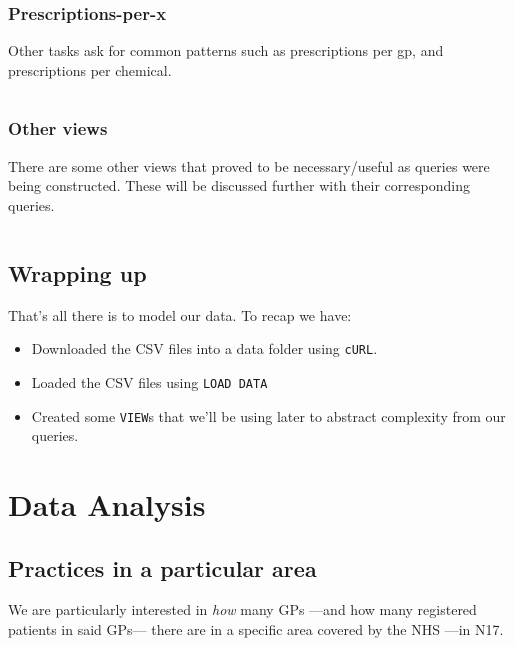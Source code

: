 \documentclass[english,a4paper,]{report}
\providecommand{\tightlist}{%
  \setlength{\itemsep}{0pt}\setlength{\parskip}{0pt}}
\begin{document}
\inputminted[firstline=4,lastline=23]{sql}{src/sql/01-views.sql}

\subsection{Prescriptions-per-x}\label{prescriptions-per-x}

Other tasks ask for common patterns such as prescriptions per gp, and
prescriptions per chemical.

\inputminted[firstline=26,lastline=38]{sql}{src/sql/01-views.sql}

\subsection{Other views}\label{other-views}

There are some other views that proved to be necessary/useful as queries
were being constructed. These will be discussed further with their
corresponding queries.

\inputminted[firstline=41]{sql}{src/sql/01-views.sql}

\section{Wrapping up}\label{wrapping-up-1}

That's all there is to model our data. To recap we have:

\begin{itemize}
\tightlist
\item
  Downloaded the CSV files into a data folder using \texttt{cURL}.
\item
  Loaded the CSV files using \texttt{LOAD\ DATA}
\item
  Created some \texttt{VIEW}s that we'll be using later to abstract
  complexity from our queries.
\end{itemize}

\chapter{Data Analysis}\label{data-analysis}

\section{Practices in a particular
area}\label{practices-in-a-particular-area}

We are particularly interested in \emph{how} many GPs ---and how many
registered patients in said GPs--- there are in a specific area covered
by the NHS ---in N17.
\end{document}
